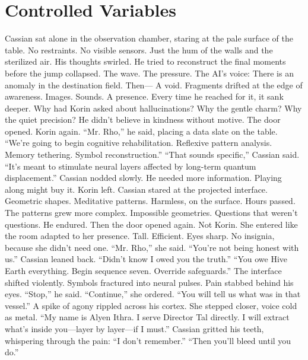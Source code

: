 \documentclass[12pt,oneside]{book}
\begin{document}

\chapter{Controlled Variables}

Cassian sat alone in the observation chamber, staring at the pale surface of the table. No restraints. No visible sensors. Just the hum of the walls and the sterilized air.
His thoughts swirled. He tried to reconstruct the final moments before the jump collapsed.
The wave.
The pressure.
The AI’s voice: There is an anomaly in the destination field.
Then—
A void.
Fragments drifted at the edge of awareness. Images. Sounds. A presence. Every time he reached for it, it sank deeper.
Why had Korin asked about hallucinations?
Why the gentle charm? Why the quiet precision?
He didn’t believe in kindness without motive.
The door opened. Korin again.
“Mr. Rho,” he said, placing a data slate on the table. “We’re going to begin cognitive rehabilitation. Reflexive pattern analysis. Memory tethering. Symbol reconstruction.”
“That sounds specific,” Cassian said.
“It’s meant to stimulate neural layers affected by long-term quantum displacement.”
Cassian nodded slowly. He needed more information. Playing along might buy it.
Korin left.
Cassian stared at the projected interface. Geometric shapes. Meditative patterns. Harmless, on the surface.
Hours passed. The patterns grew more complex. Impossible geometries. Questions that weren’t questions.
He endured.
Then the door opened again.
Not Korin.
She entered like the room adapted to her presence.
Tall. Efficient. Eyes sharp. No insignia, because she didn’t need one.
“Mr. Rho,” she said. “You’re not being honest with us.”
Cassian leaned back. “Didn’t know I owed you the truth.”
“You owe Hive Earth everything. Begin sequence seven. Override safeguards.”
The interface shifted violently. Symbols fractured into neural pulses.
Pain stabbed behind his eyes.
“Stop,” he said.
“Continue,” she ordered. “You will tell us what was in that vessel.”
A spike of agony rippled across his cortex.
She stepped closer, voice cold as metal.
“My name is Alyen Ithra. I serve Director Tal directly. I will extract what’s inside you—layer by layer—if I must.”
Cassian gritted his teeth, whispering through the pain:
“I don’t remember.”
“Then you’ll bleed until you do.”


\end{document}
